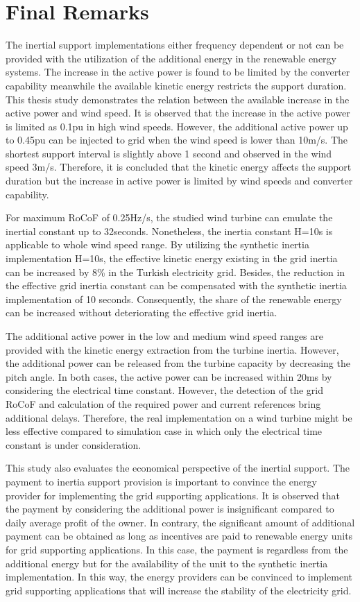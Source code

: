 \section{Final Remarks}
The inertial support implementations either frequency dependent or not can be provided with the utilization of the additional energy in the renewable energy systems. The increase in the active power is found to be limited by the converter capability meanwhile the available kinetic energy restricts the support duration. This thesis study demonstrates the relation between the available increase in the active power and wind speed. It is observed that the increase in the active power is limited as 0.1pu in high wind speeds. However, the additional active power up to 0.45pu can be injected to grid when the wind speed is lower than 10m/s. The shortest support interval is slightly above 1 second and observed in the wind speed 3m/s. Therefore, it is concluded that the kinetic energy affects the support duration but the increase in active power is limited by wind speeds and converter capability. \par
For maximum RoCoF of 0.25Hz/s, the studied wind turbine can emulate the inertial constant up to 32seconds. Nonetheless, the inertia constant H=10s is applicable to whole wind speed range. By utilizing the synthetic inertia implementation H=10s, the effective kinetic energy existing in the grid inertia can be increased by 8\% in the Turkish electricity grid. Besides, the reduction in the effective grid inertia constant can be compensated with the synthetic inertia implementation of 10 seconds. Consequently, the share of the renewable energy can be increased without deteriorating the effective grid inertia.\par
The additional active power in the low and medium wind speed ranges are provided with the kinetic energy extraction from the turbine inertia. However, the additional power can be released from the turbine capacity by decreasing the pitch angle. In both cases, the active power can be increased within 20ms by considering the electrical time constant. However, the detection of the grid RoCoF and calculation of the required power and current references bring additional delays. Therefore, the real implementation on a wind turbine might be less effective compared to simulation case in which only the electrical time constant is under consideration.\par
This study also evaluates the economical perspective of the inertial support. The payment to inertia support provision is important to convince the energy provider for implementing the grid supporting applications. It is observed that the payment by considering the additional power is insignificant compared to daily average profit of the owner. In contrary, the significant amount of additional payment can be obtained as long as incentives are paid to renewable energy units for grid supporting applications. In this case, the payment is regardless from the additional energy but for the availability of the unit to the synthetic inertia implementation. In this way, the energy providers can be convinced to implement grid supporting applications that will increase the stability of the electricity grid.
\newpage
